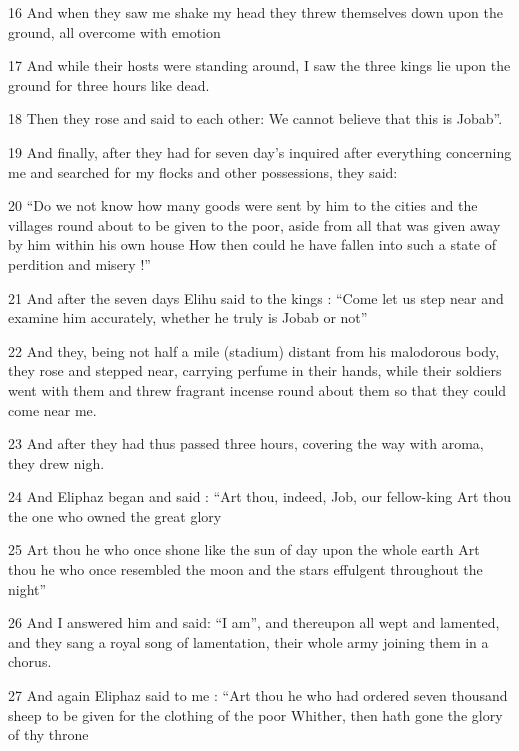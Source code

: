\par 16 And when they saw me shake my head they threw themselves down upon the ground, all overcome with emotion

\par 17 And while their hosts were standing around, I saw the three kings lie upon the ground for three hours like dead.

\par 18 Then they rose and said to each other: We cannot believe that this is Jobab”.

\par 19 And finally, after they had for seven day’s inquired after everything concerning me and searched for my flocks and other possessions, they said:

\par 20 “Do we not know how many goods were sent by him to the cities and the villages round about to be given to the poor, aside from all that was given away by him within his own house How then could he have fallen into such a state of perdition and misery !”

\par 21 And after the seven days Elihu said to the kings : “Come let us step near and examine him accurately, whether he truly is Jobab or not”

\par 22 And they, being not half a mile (stadium) distant from his malodorous body, they rose and stepped near, carrying perfume in their hands, while their soldiers went with them and threw fragrant incense round about them so that they could come near me.

\par 23 And after they had thus passed three hours, covering the way with aroma, they drew nigh.

\par 24 And Eliphaz began and said : “Art thou, indeed, Job, our fellow-king Art thou the one who owned the great glory

\par 25 Art thou he who once shone like the sun of day upon the whole earth Art thou he who once resembled the moon and the stars effulgent throughout the night”

\par 26 And I answered him and said: “I am”, and thereupon all wept and lamented, and they sang a royal song of lamentation, their whole army joining them in a chorus.

\par 27 And again Eliphaz said to me : “Art thou he who had ordered seven thousand sheep to be given for the clothing of the poor Whither, then hath gone the glory of thy throne

